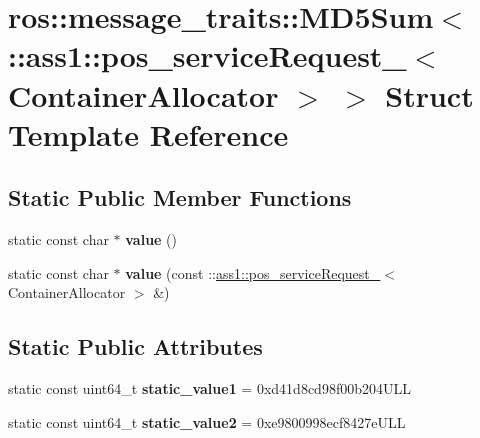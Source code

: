 \hypertarget{structros_1_1message__traits_1_1MD5Sum_3_01_1_1ass1_1_1pos__serviceRequest___3_01ContainerAllocator_01_4_01_4}{}\section{ros\+:\+:message\+\_\+traits\+:\+:M\+D5\+Sum$<$ \+:\+:ass1\+:\+:pos\+\_\+service\+Request\+\_\+$<$ Container\+Allocator $>$ $>$ Struct Template Reference}
\label{structros_1_1message__traits_1_1MD5Sum_3_01_1_1ass1_1_1pos__serviceRequest___3_01ContainerAllocator_01_4_01_4}
\subsection*{Static Public Member Functions}
\begin{DoxyCompactItemize}
\item 
\mbox{\label{structros_1_1message__traits_1_1MD5Sum_3_01_1_1ass1_1_1pos__serviceRequest___3_01ContainerAllocator_01_4_01_4_ab205bf703e1a58bb0c87431946073998}} 
static const char $\ast$ {\bfseries value} ()
\item 
\mbox{\label{structros_1_1message__traits_1_1MD5Sum_3_01_1_1ass1_1_1pos__serviceRequest___3_01ContainerAllocator_01_4_01_4_af693cfc475d621f684afd079effc8857}} 
static const char $\ast$ {\bfseries value} (const \+::\hyperlink{structass1_1_1pos__serviceRequest__}{ass1\+::pos\+\_\+service\+Request\+\_\+}$<$ Container\+Allocator $>$ \&)
\end{DoxyCompactItemize}
\subsection*{Static Public Attributes}
\begin{DoxyCompactItemize}
\item 
\mbox{\label{structros_1_1message__traits_1_1MD5Sum_3_01_1_1ass1_1_1pos__serviceRequest___3_01ContainerAllocator_01_4_01_4_a56f86319ac12555c06af4b6e76251adb}} 
static const uint64\+\_\+t {\bfseries static\+\_\+value1} = 0xd41d8cd98f00b204\+U\+LL
\item 
\mbox{\label{structros_1_1message__traits_1_1MD5Sum_3_01_1_1ass1_1_1pos__serviceRequest___3_01ContainerAllocator_01_4_01_4_aac272f99ab790a41d1a8bf8d62068852}} 
static const uint64\+\_\+t {\bfseries static\+\_\+value2} = 0xe9800998ecf8427e\+U\+LL
\end{DoxyCompactItemize}


